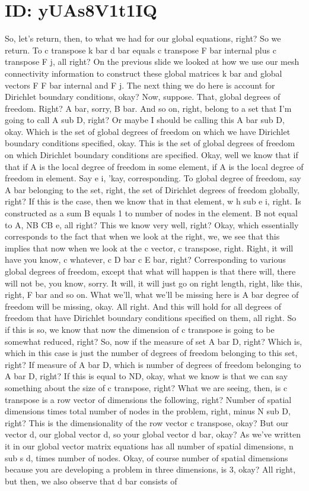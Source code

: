 \documentclass[10pt]{article}
\begin{document}
\section*{ID: yUAs8V1t1IQ}
So, let's return, then, to what we had for our global equations, right? So we return. To c transpose k bar d bar equals c transpose F bar internal plus c transpose F j, all right? On the previous slide we looked at how we use our mesh connectivity information to construct these global matrices k bar and global vectors F F bar internal and F j. The next thing we do here is account for Dirichlet boundary conditions, okay? Now, suppose. That, global degrees of freedom. Right? A bar, sorry, B bar. And so on, right, belong to a set that I'm going to call A sub D, right? Or maybe I should be calling this A bar sub D, okay. Which is the set of global degrees of freedom on which we have Dirichlet boundary conditions specified, okay. This is the set of global degrees of freedom on which Dirichlet boundary conditions are specified. Okay, well we know that if that if A is the local degree of freedom in some element, if A is the local degree of freedom in element. Say e i, 'kay, corresponding. To global degree of freedom, say A bar belonging to the set, right, the set of Dirichlet degrees of freedom globally, right? If this is the case, then we know that in that element, w h sub e i, right. Is constructed as a sum B equals 1 to number of nodes in the element. B not equal to A, NB CB e, all right? This we know very well, right? Okay, which essentially corresponds to the fact that when we look at the right, we, we see that this implies that now when we look at the c vector, c transpose, right. Right, it will have you know, c whatever, c D bar c E bar, right? Corresponding to various global degrees of freedom, except that what will happen is that there will, there will not be, you know, sorry. It will, it will just go on right length, right, like this, right, F bar and so on. What we'll, what we'll be missing here is A bar degree of freedom will be missing, okay. All right. And this will hold for all degrees of freedom that have Dirichlet boundary conditions specified on them, all right. So if this is so, we know that now the dimension of c transpose is going to be somewhat reduced, right? So, now if the measure of set A bar D, right? Which is, which in this case is just the number of degrees of freedom belonging to this set, right? If measure of A bar D, which is number of degrees of freedom belonging to A bar D, right? If this is equal to ND, okay, what we know is that we can say something about the size of c transpose, right? What we are seeing, then, is c transpose is a row vector of dimensions the following, right? Number of spatial dimensions times total number of nodes in the problem, right, minus N sub D, right? This is the dimensionality of the row vector c transpose, okay? But our vector d, our global vector d, so your global vector d bar, okay? As we've written it in our global vector matrix equations has all number of spatial dimensions, n sub s d, times number of nodes. Okay, of course number of spatial dimensions because you are developing a problem in three dimensions, is 3, okay? All right, but then, we also observe that d bar consists of 
\end{document}

